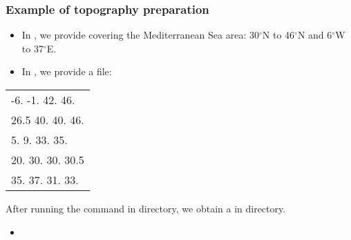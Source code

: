 \begin{frame}
\frametitle{Example of topography preparation}

\begin{itemize}
\item In , we provide  covering  the Mediterranean Sea area: 30$^{\circ}$N to 46$^{\circ}$N and 6$^{\circ}$W to 37$^{\circ}$E.
\item In , we provide a  file:
\end{itemize}

\begin{table}
\small
\centering
\begin{tabular}{|l|}
\hline
-6. -1. 42. 46.\\
26.5 40. 40. 46.\\
5. 9. 33. 35.\\
20. 30. 30. 30.5\\
35. 37. 31. 33.\\
\hline
\end{tabular}
\end{table}

After running the command  in  directory, we obtain a  in  directory.

\begin{itemize}
\item {}
\end{itemize}

\end{frame}







